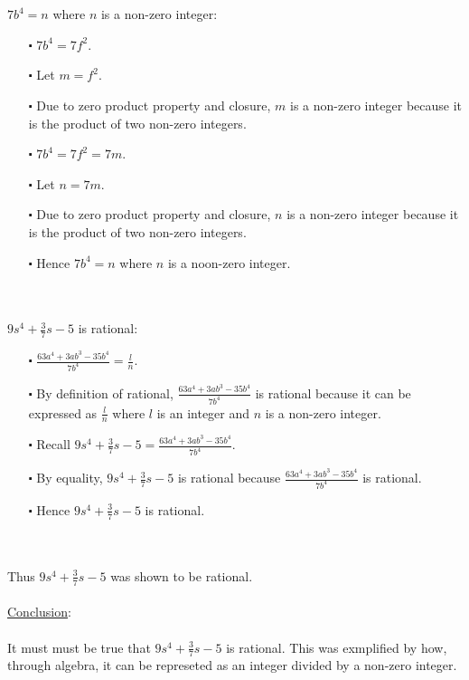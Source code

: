\documentclass[12pt]{article}
\begin{document}
\newblock
\\ \\
$7b^4 = n$ where $n$ is a non-zero integer:
\begin{itemize}
  \item [$\centerdot$] $7b^4 = 7f^2$.
  \item [$\centerdot$] Let $m = f^2$.
  \item [$\centerdot$] Due to zero product property and closure, $m$ is a non-zero integer because it is the product of two non-zero integers.
  \item [$\centerdot$] $7b^4 = 7f^2 = 7m$.
  \item [$\centerdot$] Let $n = 7m$.
  \item [$\centerdot$] Due to zero product property and closure, $n$ is a non-zero integer because it is the product of two non-zero integers.
  \item [$\centerdot$] Hence $7b^4 = n$ where $n$ is a noon-zero integer.
\end{itemize}
\newblock
\\ \\
$9s^4 + \frac{3}{7}s -5$ is rational:
\begin{itemize}
  \item [$\centerdot$] $\frac{63a^4 + 3ab^3 - 35b^4}{7b^4} = \frac{l}{n}$.
  \item [$\centerdot$] By definition of rational, $\frac{63a^4 + 3ab^3 - 35b^4}{7b^4}$ is rational
  because it can be expressed as $\frac{l}{n}$ where $l$ is an integer and $n$ is a non-zero integer.
  \item [$\centerdot$] Recall $9s^4 + \frac{3}{7}s -5 = \frac{63a^4 + 3ab^3 - 35b^4}{7b^4}$.
  \item [$\centerdot$] By equality, $9s^4 + \frac{3}{7}s -5$ is rational because $\frac{63a^4 + 3ab^3 - 35b^4}{7b^4}$ is rational.
  \item [$\centerdot$] Hence $9s^4 + \frac{3}{7}s -5$ is rational.
\end{itemize}
\newblock
\\ \\
Thus $9s^4 + \frac{3}{7}s -5$ was shown to be rational. \\ \\
\underline{Conclusion}:
\\ \\
It must must be true that $9s^4 + \frac{3}{7}s -5$ is rational. 
This was exmplified by how, through algebra, it can be represeted as an integer divided by a non-zero integer.
\end{document}
